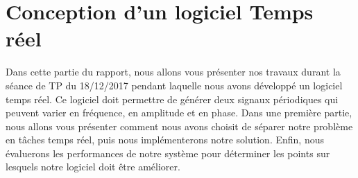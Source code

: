 \chapter{Conception d'un logiciel Temps réel}

Dans cette partie du rapport, nous allons vous présenter nos travaux durant la séance de TP du 18/12/2017 pendant laquelle nous avons développé un logiciel temps réel. Ce logiciel doit permettre de générer deux signaux périodiques qui peuvent varier en fréquence, en amplitude et en phase. Dans une première partie, nous allons vous présenter comment nous avons choisit de séparer notre problème en tâches temps réel, puis nous implémenterons notre solution. Enfin, nous évaluerons les performances de notre système pour déterminer les points sur lesquels notre logiciel doit être améliorer.


